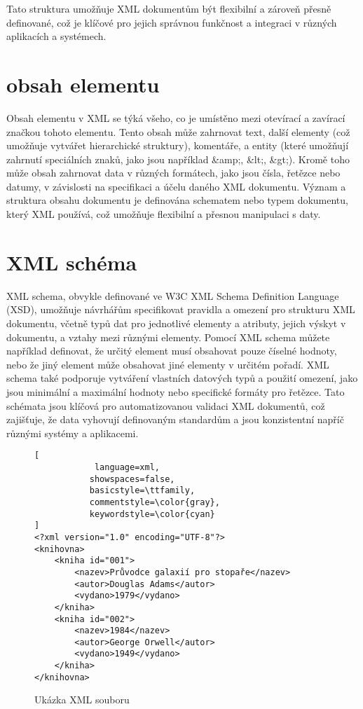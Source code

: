 Tato struktura umožňuje XML dokumentům být flexibilní a zároveň přesně definované, což je klíčové pro jejich správnou funkčnost a integraci v různých aplikacích a systémech.

\section{obsah elementu}
\label{sec:xml_obsah}
Obsah elementu v XML se týká všeho, co je umístěno mezi otevírací a zavírací značkou tohoto elementu. Tento obsah může zahrnovat text, další elementy (což umožňuje vytvářet hierarchické struktury), komentáře, a entity (které umožňují zahrnutí speciálních znaků, jako jsou například \&amp;, \&lt;, \&gt;). Kromě toho může obsah zahrnovat data v různých formátech, jako jsou čísla, řetězce nebo datumy, v závislosti na specifikaci a účelu daného XML dokumentu. Význam a struktura obsahu dokumentu je definována schematem nebo typem dokumentu, který XML používá, což umožňuje flexibilní a přesnou manipulaci s daty.

\section{XML schéma}
\label{sec:xml_schema}
 XML schema, obvykle definované ve W3C XML Schema Definition Language (XSD), umožňuje návrhářům specifikovat pravidla a omezení pro strukturu XML dokumentu, včetně typů dat pro jednotlivé elementy a atributy, jejich výskyt v dokumentu, a vztahy mezi různými elementy. Pomocí XML schema můžete například definovat, že určitý element musí obsahovat pouze číselné hodnoty, nebo že jiný element může obsahovat jiné elementy v určitém pořadí. XML schema také podporuje vytváření vlastních datových typů a použití omezení, jako jsou minimální a maximální hodnoty nebo specifické formáty pro řetězce. Tato schémata jsou klíčová pro automatizovanou validaci XML dokumentů, což zajišťuje, že data vyhovují definovaným standardům a jsou konzistentní napříč různými systémy a aplikacemi.

\begin{figure}[H]
\centering
\begin{lstlisting}[
            language=xml,
           showspaces=false,
           basicstyle=\ttfamily,
           commentstyle=\color{gray},
           keywordstyle=\color{cyan}
]
<?xml version="1.0" encoding="UTF-8"?>
<knihovna>
    <kniha id="001">
        <nazev>Průvodce galaxií pro stopaře</nazev>
        <autor>Douglas Adams</autor>
        <vydano>1979</vydano>
    </kniha>
    <kniha id="002">
        <nazev>1984</nazev>
        <autor>George Orwell</autor>
        <vydano>1949</vydano>
    </kniha>
</knihovna>
\end{lstlisting}
\caption{Ukázka XML souboru}
\label{fig:xml_file}
\end{figure}



